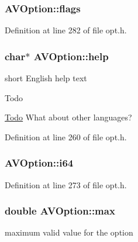 \subsubsection[{\texorpdfstring{flags}{flags}}]{ A\+V\+Option\+::flags}\hypertarget{struct_a_v_option_ae6b670af4b2c7819c35437cab61c2745}{}\label{struct_a_v_option_ae6b670af4b2c7819c35437cab61c2745}


Definition at line 282 of file opt.\+h.

\subsubsection[{\texorpdfstring{help}{help}}]{ char$\ast$ A\+V\+Option\+::help}\hypertarget{struct_a_v_option_a6c72d22b8c599e89abba088b85dfcd8a}{}\label{struct_a_v_option_a6c72d22b8c599e89abba088b85dfcd8a}
short English help text \begin{DoxyRefDesc}{Todo}
\item[\hyperlink{todo__todo000003}{Todo}]What about other languages? \end{DoxyRefDesc}


Definition at line 260 of file opt.\+h.

\subsubsection[{\texorpdfstring{i64}{i64}}]{ A\+V\+Option\+::i64}\hypertarget{struct_a_v_option_a9ee4ba4426ba1ff7e2f8030d2c49ba35}{}\label{struct_a_v_option_a9ee4ba4426ba1ff7e2f8030d2c49ba35}


Definition at line 273 of file opt.\+h.

\subsubsection[{\texorpdfstring{max}{max}}]{\setlength{\rightskip}{0pt plus 5cm}double A\+V\+Option\+::max}\hypertarget{struct_a_v_option_a078ff8d3707143690d7d59d87d4706f4}{}\label{struct_a_v_option_a078ff8d3707143690d7d59d87d4706f4}


maximum valid value for the option 



